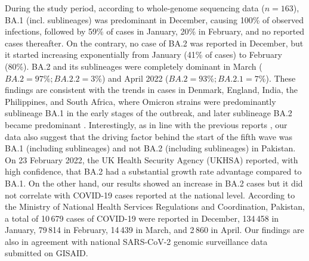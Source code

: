 During the study period, according to whole-genome sequencing data ($n=163$), BA.1 (incl. sublineages) was predominant in December, causing 100\% of observed infections, followed by 59\% of cases in January, 20\% in February, and no reported cases thereafter.
On the contrary, no case of BA.2 was reported in December, but it started increasing exponentially from January (41\% of cases) to February (80\%).
BA.2 and its sublineages were completely dominant in March ($BA.2=97\%; BA.2.2=3\%$) and April 2022 ($BA.2=93\%; BA.2.1=7\%$).
These findings are consistent with the trends in cases in Denmark, England, India, the Philippines, and South Africa, where Omicron strains were predominantly sublineage BA.1 in the early stages of the outbreak, and later sublineage BA.2 became predominant \citep{hodcroft2021covariants}.
Interestingly, as in line with the previous reports \citep{mahase2022covid1, mahase2022covid2}, our data also suggest that the driving factor behind the start of the fifth wave was BA.1 (including sublineages) and not BA.2 (including sublineages) in Pakistan.
On 23 February 2022, the UK Health Security Agency (UKHSA) reported, with high confidence, that BA.2 had a substantial growth rate advantage compared to BA.1\citep{ukhsa-risk-assessment}.
On the other hand, our results showed an increase in BA.2 cases but it did not correlate with COVID-19 cases reported at the national level. 
According to the Ministry of National Health Services Regulations and Coordination, Pakistan, a total of 10\,679 cases of COVID-19 were reported in December, 134\,458 in January, 79\,814 in February, 14\,439 in March, and 2\,860 in April.
Our findings are also in agreement with national SARS-CoV-2 genomic surveillance data submitted on GISAID.

